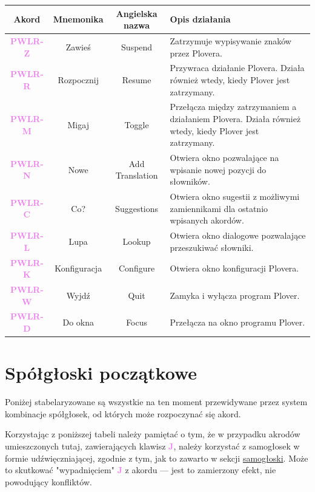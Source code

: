 \documentclass[12p, oneside]{book}
\newcommand{\steno}[1]{\textbf{\textsf{\textcolor{violet}{ #1}}}}
\begin{document}
\begin{tabular}{| c | c | c | p{5cm} |}
\hline
Akord & Mnemonika & Angielska nazwa & Opis działania \\ \hline
 \steno{PWLR-Z} & Zawieś & Suspend & Zatrzymuje wypisywanie znaków przez
 Plovera.\\ \hline
 \steno{PWLR-R} & Rozpocznij & Resume & Przywraca działanie Plovera. Działa
 również wtedy, kiedy Plover jest zatrzymany.\\ \hline
 \steno{PWLR-M} & Migaj & Toggle & Przełącza między zatrzymaniem a działaniem
 Plovera. Działa również wtedy, kiedy Plover jest zatrzymany. \\ \hline
 \steno{PWLR-N} & Nowe & Add Translation & Otwiera okno pozwalające na wpisanie
 nowej pozycji do słowników. \\ \hline
 \steno{PWLR-C} & Co? & Suggestions & Otwiera okno sugestii z możliwymi
 zamiennikami dla ostatnio wpisanych akordów. \\ \hline
 \steno{PWLR-L} & Lupa & Lookup & Otwiera okno dialogowe pozwalające
 przeszukiwać słowniki. \\ \hline
 \steno{PWLR-K} & Konfiguracja & Configure & Otwiera okno konfiguracji Plovera.
 \\ \hline
 \steno{PWLR-W} & Wyjdź & Quit & Zamyka i wyłącza program Plover. \\ \hline
 \steno{PWLR-D} & Do okna & Focus & Przełącza na okno programu Plover. \\ \hline
\end{tabular}

\newpage


\section{Spółgłoski początkowe}
\label{sec:poczatkowe}

Poniżej stabelaryzowane są wszystkie na ten moment przewidywane przez system
kombinacje spółgłosek, od których może rozpoczynać się akord.

Korzystając z poniższej tabeli należy pamiętać o tym, że w przypadku akrodów
umieszczonych tutaj, zawierających klawisz \steno{J}, należy korzystać z
samogłosek w formie udźwięczniającej, zgodnie z tym, jak to zawarto w sekcji
\hyperref[sec:samogloski]{samogłoski}. Może to skutkować "wypadnięciem"
\steno{J} z akordu --- jest to zamierzony efekt, nie powodujący konfliktów.
\end{document}
